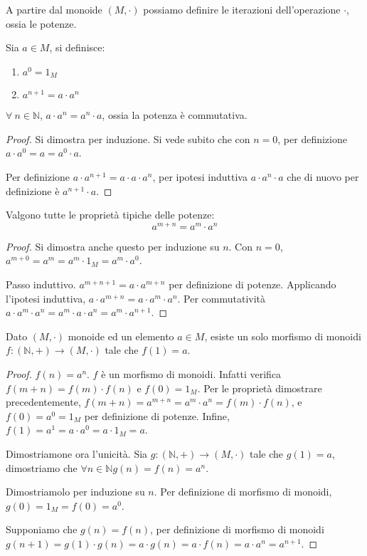 \begin{defn}[Potenze]
A partire dal monoide $(M, \cdot)$ possiamo definire le iterazioni dell'operazione $\cdot$, ossia le potenze.

Sia $ a \in M$, si definisce:
\begin{enumerate}
    \item $a^0 = 1_M$
    \item $a^{n+1} = a \cdot a^{n}$
\end{enumerate}
\end{defn}
\begin{prop}
$\forall \ n \in \mathbb{N}$, $a \cdot a^n = a^n \cdot a$, ossia la potenza \`e commutativa.
\end{prop}
\begin{proof}
Si dimostra per induzione. Si vede subito che con $n = 0$, per definizione $a \cdot a^0 = a = a^0 \cdot a$.

Per definizione $a \cdot a^{n+1} = a \cdot a \cdot a^{n} $, per ipotesi induttiva $ a \cdot a^n \cdot a $ che di nuovo per definizione \`e $ a^{n+1} \cdot a$.
\end{proof}
\begin{prop}
Valgono tutte le propriet\`a tipiche delle potenze:
\[
a^{m + n} = a^m \cdot a^n
\]
\end{prop}
\begin{proof}
Si dimostra anche questo per induzione su $n$. Con $n = 0$, $a^{m+0} = a^m = a^m \cdot 1_M = a^m \cdot a^0$.

Passo induttivo. $a^{m + n + 1} = a \cdot a^{m + n}$ per definizione di potenze. Applicando l'ipotesi induttiva, $a \cdot a^{m + n} = a \cdot a^m \cdot a^n$. Per commutativit\`a $a \cdot a^m \cdot a^n = a^m \cdot a \cdot a^n = a^m \cdot a^{n+1}$.
\end{proof}

\begin{theorem}
Dato $(M, \cdot)$ monoide ed un elemento $a \in M$, esiste un solo morfismo di monoidi $f : (\mathbb{N}, +) \to (M, \cdot)$ tale che $f(1) = a$.
\end{theorem}
\begin{proof}
$f(n) = a^n$. $f$ \`e un morfismo di monoidi. Infatti verifica $f(m+n) = f(m) \cdot f(n)$ e $f(0) = 1_M$. Per le propriet\`a dimostrare precedentemente, $f(m+ n) = a^{m+n} = a^m \cdot a^n = f(m) \cdot f(n)$, e $f(0) = a^0 = 1_M$ per definizione di potenze. Infine, $f(1) = a^1 = a \cdot a^0 = a \cdot 1_M = a$.

Dimostriamone ora l'unicit\`a. Sia $g : (\mathbb{N}, +) \to (M, \cdot )$ tale che $g(1) = a$, dimostriamo che $\forall n \in \mathbb{N} g(n) = f(n) = a^n$.

Dimostriamolo per induzione su $n$. Per definizione di morfismo di monoidi, $g(0) = 1_M = f(0) = a^0$.

Supponiamo che $g(n) = f(n)$, per definizione di morfismo di monoidi $g(n+1) = g(1) \cdot g(n) = a \cdot g(n) = a \cdot f(n) = a \cdot a^n = a^{n+1}$.
\end{proof}

